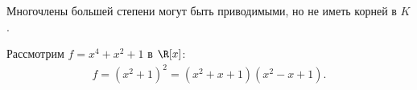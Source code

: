 \begin{notice}
    Многочлены большей степени могут быть приводимыми, но не иметь корней в $K$.
    \begin{example}
        Рассмотрим $f = x^4 + x^2 + 1$ в $\R[x]$:
        \begin{gather*}
            f = (x^2 + 1)^2 = (x^2 + x + 1)(x^2 - x + 1).
        \end{gather*}
    \end{example}
\end{notice}
